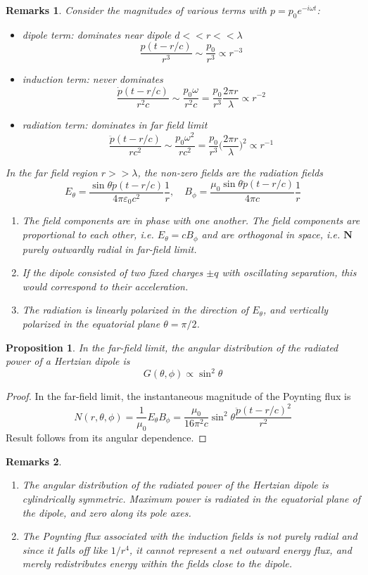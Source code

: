 \documentclass[a4paper]{article}
\newtheorem{remarks}{Remarks}[section]
\theoremstyle{new}
\newtheorem{prop}{Proposition}[section]
\begin{document}
\begin{remarks}
Consider the magnitudes of various terms with $p=p_0e^{-i\omega t}$:
\begin{itemize}
    \item dipole term: dominates near dipole $d<<r<<\lambda$
    $$\frac{p(t-r/c)}{r^3}\sim\frac{p_0}{r^3}\propto r^{-3}$$
    \item induction term: never dominates
    $$\frac{\dot{p}(t-r/c)}{r^2c}\sim\frac{p_0\omega}{r^2c}=\frac{p_0}{r^3}\frac{2\pi r}{\lambda}\propto r^{-2}$$
    \item radiation term: dominates in far field limit
    $$\frac{\ddot{p}(t-r/c)}{rc^2}\sim\frac{p_0\omega^2}{rc^2}=\frac{p_0}{r^3}\bigg(\frac{2\pi r}{\lambda}\bigg)^2\propto r^{-1}$$
\end{itemize}
In the far field region $r>>\lambda$, the non-zero fields are the radiation fields
$$E_\theta=\frac{\sin\theta\ddot{p}(t-r/c)}{4\pi\varepsilon_0c^2}\frac{1}{r},\quad B_\phi=\frac{\mu_0\sin\theta\ddot{p}(t-r/c)}{4\pi c}\frac{1}{r}$$
\begin{enumerate}
    \item The field components are in phase with one another. The field components are proportional to each other, i.e. $E_\theta=cB_\phi$ and are orthogonal in space, i.e. $\mathbf{N}$ purely outwardly radial in far-field limit.
    \item If the dipole consisted of two fixed charges $\pm q$ with oscillating separation, this would correspond to their acceleration.
    \item The radiation is linearly polarized in the direction of $E_\theta$, and vertically polarized in the equatorial plane $\theta=\pi/2$.
\end{enumerate}
\end{remarks}
\begin{prop}
In the far-field limit, the angular distribution of the radiated power of a Hertzian dipole is 
$$G(\theta,\phi)\propto\sin^2\theta$$
\end{prop}
\begin{proof}
In the far-field limit, the instantaneous magnitude of the Poynting flux is 
$$N(r,\theta,\phi)=\frac{1}{\mu_0}E_\theta B_\phi=\frac{\mu_0}{16\pi^2c}\sin^2\theta\frac{\ddot{p}(t-r/c)^2}{r^2}$$
Result follows from its angular dependence.
\end{proof}
\begin{remarks}\leavevmode
\begin{enumerate}
\item The angular distribution of the radiated power of the Hertzian dipole is cylindrically symmetric. Maximum power is radiated in the equatorial plane of the dipole, and zero along its pole axes.
\item The Poynting flux associated with the induction fields is not purely radial and since it falls off like $1/r^4$, it cannot represent a net outward energy flux, and merely redistributes energy within the fields close to the dipole.
\end{enumerate}
\end{remarks}
\end{document}

